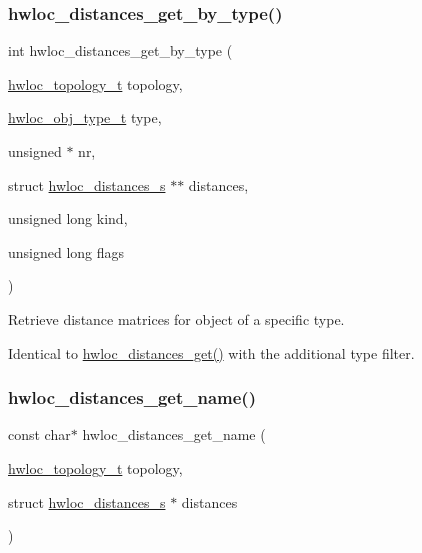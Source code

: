 \subsubsection{\texorpdfstring{hwloc\+\_\+distances\+\_\+get\+\_\+by\+\_\+type()}{hwloc\_distances\_get\_by\_type()}}
{\footnotesize\ttfamily int hwloc\+\_\+distances\+\_\+get\+\_\+by\+\_\+type (\begin{DoxyParamCaption}\item[{\hyperlink{a00186_ga9d1e76ee15a7dee158b786c30b6a6e38}{hwloc\+\_\+topology\+\_\+t}}]{topology,  }\item[{\hyperlink{a00184_gacd37bb612667dc437d66bfb175a8dc55}{hwloc\+\_\+obj\+\_\+type\+\_\+t}}]{type,  }\item[{unsigned $\ast$}]{nr,  }\item[{struct \hyperlink{a00310}{hwloc\+\_\+distances\+\_\+s} $\ast$$\ast$}]{distances,  }\item[{unsigned long}]{kind,  }\item[{unsigned long}]{flags }\end{DoxyParamCaption})}



Retrieve distance matrices for object of a specific type. 

Identical to \hyperlink{a00208_ga613e6b2a5d0f06626ee8d0c12fa46691}{hwloc\+\_\+distances\+\_\+get()} with the additional {\ttfamily type} filter. \mbox{\label{a00208_gaa6f9697028c589cef0458edef5fe273f}} 
\subsubsection{\texorpdfstring{hwloc\+\_\+distances\+\_\+get\+\_\+name()}{hwloc\_distances\_get\_name()}}
{\footnotesize\ttfamily const char$\ast$ hwloc\+\_\+distances\+\_\+get\+\_\+name (\begin{DoxyParamCaption}\item[{\hyperlink{a00186_ga9d1e76ee15a7dee158b786c30b6a6e38}{hwloc\+\_\+topology\+\_\+t}}]{topology,  }\item[{struct \hyperlink{a00310}{hwloc\+\_\+distances\+\_\+s} $\ast$}]{distances }\end{DoxyParamCaption})}



